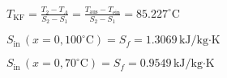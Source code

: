 \( T_{\text{KF}} = \frac{T_2 - T_A}{S_2 - S_1} = \frac{T_{\text{aus}} - T_{\text{ein}}}{S_2 - S_1} = 85.227^\circ \text{C} \)  

\( S_{\text{in}} \, (x = 0, 100^\circ \text{C}) = S_f = 1.3069 \, \text{kJ/kg·K} \)  

\( S_{\text{in}} \, (x = 0, 70^\circ \text{C}) = S_f = 0.9549 \, \text{kJ/kg·K} \)